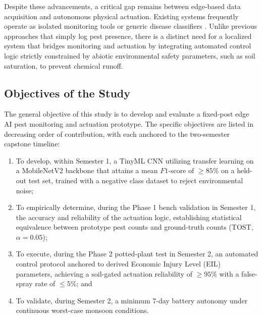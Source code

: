 \documentclass[conference]{IEEEtran}
\begin{document}
Despite these advancements, a critical gap remains between edge-based data acquisition and autonomous physical actuation. Existing systems frequently operate as isolated monitoring tools \cite{wang2024} or generic disease classifiers \cite{sneineh2023}. Unlike previous approaches that simply log pest presence, there is a distinct need for a localized system that bridges monitoring and actuation by integrating automated control logic strictly constrained by abiotic environmental safety parameters, such as soil saturation, to prevent chemical runoff.

\subsection{Objectives of the Study}
The general objective of this study is to develop and evaluate a fixed-post edge AI pest monitoring and actuation prototype. The specific objectives are listed in decreasing order of contribution, with each anchored to the two-semester capstone timeline:
\begin{enumerate}
    \item To develop, within Semester 1, a TinyML CNN utilizing transfer learning on a MobileNetV2 backbone that attains a mean $F1$-score of $\geq 85\%$ on a held-out test set, trained with a negative class dataset to reject environmental noise;
    \item To empirically determine, during the Phase 1 bench validation in Semester 1, the accuracy and reliability of the actuation logic, establishing statistical equivalence between prototype pest counts and ground-truth counts (TOST, $\alpha = 0.05$);
    \item To execute, during the Phase 2 potted-plant test in Semester 2, an automated control protocol anchored to derived Economic Injury Level (EIL) parameters, achieving a soil-gated actuation reliability of $\geq 95\%$ with a false-spray rate of $\leq 5\%$; and
    \item To validate, during Semester 2, a minimum 7-day battery autonomy under continuous worst-case monsoon conditions.
\end{enumerate}
\end{document}

